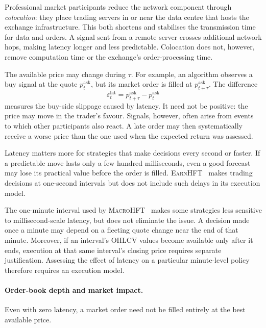 \documentclass[9pt,a4paper,twocolumn]{extarticle}
\newcommand{\Macro}{\textsc{MacroHFT}}
\newcommand{\Earn}{\textsc{EarnHFT}}
\begin{document}
Professional market participants reduce the network component through \emph{colocation}: they
place trading servers in or near the data centre that hosts the exchange infrastructure. This
both shortens and stabilises the transmission time for data and orders. A signal sent from a
remote server crosses additional network hops, making latency longer and less predictable.
Colocation does not, however, remove computation time or the exchange's order-processing time.

The available price may change during $\tau$. For example, an algorithm observes a buy signal at
the quote $p_t^{\mathrm{ask}}$, but its market order is filled at
$p_{t+\tau}^{\mathrm{ask}}$. The difference
\begin{equation}
    \varepsilon_t^{\mathrm{lat}}
    =
    p_{t+\tau}^{\mathrm{ask}}
    -p_t^{\mathrm{ask}}
    \label{eq:latency_slippage}
\end{equation}
measures the buy-side slippage caused by latency. It need not be positive: the price may move in
the trader's favour. Signals, however, often arise from events to which other participants also
react. A late order may then systematically receive a worse price than the one used when the
expected return was assessed.

Latency matters more for strategies that make decisions every second or faster. If a predictable
move lasts only a few hundred milliseconds, even a good forecast may lose its practical value
before the order is filled. \Earn{}~\cite{qin2024earnhft} makes trading decisions at one-second
intervals but does not include such delays in its execution model.

The one-minute interval used by \Macro{}~\cite{zong2024macrohft} makes some strategies less
sensitive to millisecond-scale latency, but does not eliminate the issue. A decision made once a
minute may depend on a fleeting quote change near the end of that minute. Moreover, if an
interval's OHLCV values become available only after it ends, execution at that same interval's
closing price requires separate justification. Assessing the effect of latency on a particular
minute-level policy therefore requires an execution model.

\paragraph{Order-book depth and market impact.}

Even with zero latency, a market order need not be filled entirely at the best available price.
\end{document}
